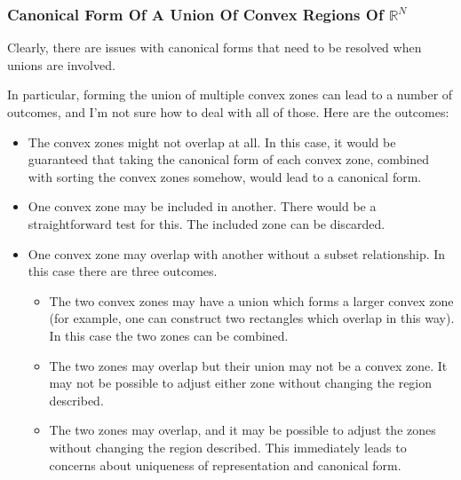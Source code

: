 \subsubsection[Canonical Form Of A Union Of Convex Regions Of $\mathbb{R}^N$]
              {Canonical Form Of A Union Of Convex Regions Of \mbox{\boldmath $\mathbb{R}^N$}}
\label{siop0:surn0:cfu0}

Clearly, there are issues with canonical forms that need to be resolved
when unions are involved.

In particular, forming the union of multiple convex zones can lead to a number of outcomes,
and I'm not sure how to deal with all of those.  Here are the outcomes:

\begin{itemize}
\item The convex zones might not overlap at all.  In this case, 
      it would be guaranteed that taking the canonical form of
      each convex zone, combined with sorting the convex zones somehow,
      would lead to a canonical form.
\item One convex zone may be included in another.  There would be a straightforward
      test for this.  The included zone can be discarded.
\item One convex zone may overlap with another without a subset relationship.  
      In this case there are three outcomes.
      \begin{itemize}
      \item The two convex zones may have a union which forms a larger
            convex zone (for example, one can construct two rectangles
            which overlap in this way).  In this case the two zones can be
            combined.
      \item The two zones may overlap but their union may not be a 
            convex zone.  It may not be possible to adjust either zone
            without changing the region described.
      \item The two zones may overlap, and it may be possible to 
            adjust the zones without changing the region described.
            This immediately leads to concerns about uniqueness of 
            representation and canonical form.
      \end{itemize}
\end{itemize}

